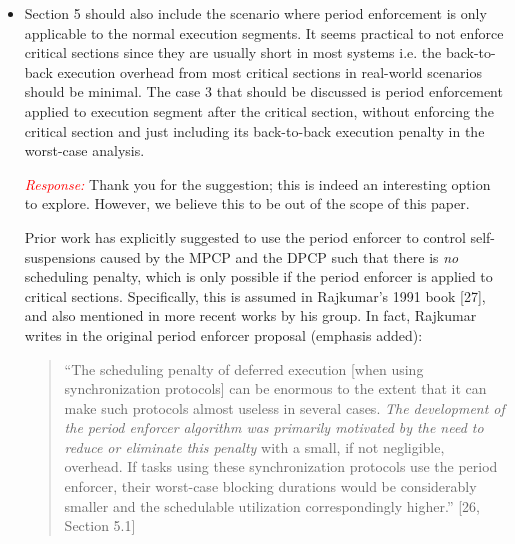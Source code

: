 \documentclass[12pt]{article}
\newenvironment{response}[0]{\textcolor{red}{\emph{Response: }}\color{blue}}{\medskip}
\newcommand{\action}[1]{\textcolor{red}{\emph{\it Actions taken: }}{\color{blue}#1}\medskip}
\begin{document}
\begin{itemize}
\begin{response}
We need the analysis from Nelissen et al.\ to precisely break a self-suspending task into multiple deferrable subtasks so that we can calculate the worst-case release jitter of a computation segment. Section 4 explains why it is difficult to precisely calculate the release jitter of the computation segments and clearly points out the connection to Nelissen et al.'s analysis.

\end{response}

\action{In the revision, we completely rewrote Section 4 to explain the gap between the segmented self-suspending task model and the corresponding deferrable sporadic task set, and to precisely state the equivalence of the conversion to the worst-case response-time analysis of individual computation segments (i.e., Nelissen et al.'s analysis).
}

	\item 
Section 5 should also include the scenario where period enforcement is only
applicable to the normal execution segments. It seems practical to not
enforce critical sections since they are usually short in most systems i.e.
the back-to-back execution overhead from most critical sections in
real-world scenarios should be minimal. The case 3 that should be discussed
is period enforcement applied to execution segment after the critical
section, without enforcing the critical section and just including its
back-to-back execution penalty in the worst-case analysis.


\begin{response}
Thank you for the suggestion; this is indeed an interesting option to explore. However, we believe this to be out of the scope of this paper. 

Prior work has explicitly suggested to use the period enforcer to control self-suspensions caused by the MPCP and the DPCP such that there is \emph{no} scheduling penalty, which is only possible if the period enforcer is applied to critical sections. Specifically, this is assumed in Rajkumar's 1991 book [27], and also mentioned in more recent works by his group. In fact, Rajkumar writes in the original period enforcer proposal (emphasis added):

\begin{quote}
	``The scheduling penalty of deferred execution [when using synchronization protocols] can be enormous to the extent that it can make such protocols almost useless in several cases. \emph{The development of the period enforcer algorithm was primarily motivated by the need to reduce or eliminate this penalty} with a small, if not negligible, overhead. If tasks using these synchronization protocols use the period enforcer, their worst-case blocking durations would be considerably smaller and the schedulable utilization correspondingly higher.'' [26, Section 5.1]
\end{quote}



\end{response}
\end{itemize}
\end{document}
